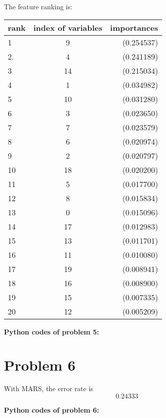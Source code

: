 \documentclass{article}
\begin{document}
The feature ranking is:
\begin{center}
\begin{tabular}{ l | c | r  }
\hline
rank & index of variables & importances \\
\hline
1 & 9 & (0.254537) \\
2. & 4 & (0.241189) \\
3 &14 & (0.215034) \\
4 & 1 & (0.034982) \\
5 & 10 & (0.031280) \\
6 & 3 & (0.023650) \\
7 & 7 & (0.023579) \\
8 & 6 & (0.020974) \\
9 & 2 & (0.020797) \\ 
10 & 18 & (0.020200) \\
11& 5 & (0.017700) \\
12 & 8 & (0.015834) \\
13 & 0 & (0.015096) \\
14 & 17 & (0.012983) \\ 
15 & 13 & (0.011701) \\
16& 11 & (0.010080) \\ 
17 & 19 & (0.008941) \\
18 & 16 & (0.008900) \\
19 & 15 & (0.007335) \\
20 & 12 & (0.005209) \\
\end{tabular}
\end{center}

\textbf{Python codes of problem 5:}


\section{Problem 6}
With MARS, the error rate is
 			\begin{equation}
				0.24333
				\end{equation} 

\textbf{Python codes of problem 6:}

\end{document}
